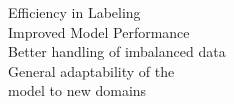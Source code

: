 \documentclass[preview]{standalone}
\begin{document}
Efficiency in Labeling\\Improved Model Performance\\Better handling of imbalanced data\\General adaptability of the \\model to new domains\\
\end{document}
